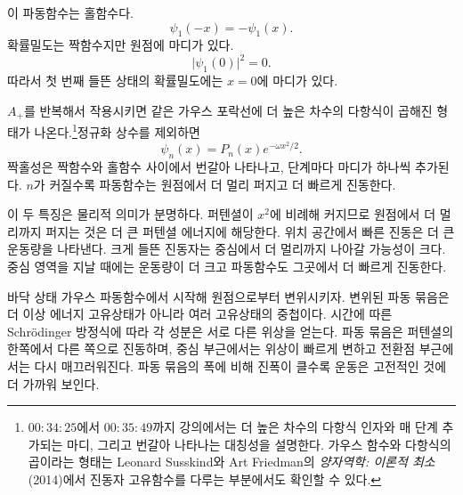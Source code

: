 이 파동함수는 홀함수다.
\begin{equation}
\psi_{1}(-x)=-\psi_{1}(x).
\end{equation}
확률밀도는 짝함수지만 원점에 마디가 있다.
\begin{equation}
\lvert\psi_{1}(0)\rvert^{2}=0.
\end{equation}
따라서 첫 번째 들뜬 상태의 확률밀도에는 \(x=0\)에 마디가 있다.

\(A_{+}\)를 반복해서 작용시키면 같은 가우스 포락선에 더 높은 차수의 다항식이 곱해진 형태가 나온다.\footnote{\(00{:}34{:}25\)에서 \(00{:}35{:}49\)까지 강의에서는 더 높은 차수의 다항식 인자와 매 단계 추가되는 마디, 그리고 번갈아 나타나는 대칭성을 설명한다. 가우스 함수와 다항식의 곱이라는 형태는 Leonard Susskind와 Art Friedman의 \emph{양자역학: 이론적 최소}(2014)에서 진동자 고유함수를 다루는 부분에서도 확인할 수 있다.}정규화 상수를 제외하면
\begin{equation}
\psi_{n}(x)=P_{n}(x)e^{-\omega x^{2}/2}.
\end{equation}
짝홀성은 짝함수와 홀함수 사이에서 번갈아 나타나고, 단계마다 마디가 하나씩 추가된다. \(n\)가 커질수록 파동함수는 원점에서 더 멀리 퍼지고 더 빠르게 진동한다.

이 두 특징은 물리적 의미가 분명하다. 퍼텐셜이 \(x^{2}\)에 비례해 커지므로 원점에서 더 멀리까지 퍼지는 것은 더 큰 퍼텐셜 에너지에 해당한다. 위치 공간에서 빠른 진동은 더 큰 운동량을 나타낸다. 크게 들뜬 진동자는 중심에서 더 멀리까지 나아갈 가능성이 크다. 중심 영역을 지날 때에는 운동량이 더 크고 파동함수도 그곳에서 더 빠르게 진동한다.

\begin{classroomqa}
\end{classroomqa}

바닥 상태 가우스 파동함수에서 시작해 원점으로부터 변위시키자. 변위된 파동 묶음은 더 이상 에너지 고유상태가 아니라 여러 고유상태의 중첩이다. 시간에 따른 Schr\"odinger 방정식에 따라 각 성분은 서로 다른 위상을 얻는다. 파동 묶음은 퍼텐셜의 한쪽에서 다른 쪽으로 진동하며, 중심 부근에서는 위상이 빠르게 변하고 전환점 부근에서는 다시 매끄러워진다. 파동 묶음의 폭에 비해 진폭이 클수록 운동은 고전적인 것에 더 가까워 보인다.

\begin{classroomqa}
\end{classroomqa}

